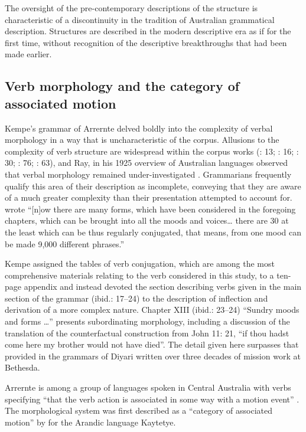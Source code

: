 The oversight of the pre-contemporary descriptions of the structure is characteristic of a discontinuity in the tradition of Australian grammatical description. Structures are described in the modern descriptive era as if for the first time, without recognition of the descriptive breakthroughs that had been made earlier.

\subsection{Verb morphology and the category of associated motion}
\label{sec:key:9.3.2}\label{bkm:Ref456085056}

Kempe’s grammar of Arrernte delved boldly into the complexity of verbal morphology in a way that is uncharacteristic of the corpus. Allusions to the complexity of verb structure are widespread within the corpus works (\citealt{teichelmann_outlines_1840}: 13; \citealt{schurmann_letter_1844}: 16; \citeyear{schurmann_aboriginal_1846}: 30; \citealt{ridley_kamilaroi_1855}: 76; \citeyear{ridley_kamilaroi_1866}: 63), and Ray, in his 1925 overview of Australian languages observed that verbal morphology remained under-investigated \citep[6]{ray_aboriginal_1925}. Grammarians frequently qualify this area of their description as incomplete, conveying that they are aware of a much greater complexity than their presentation attempted to account for. \citet[25]{kempe_grammar_1891} wrote “[n]ow there are many forms, which have been considered in the foregoing chapters, which can be brought into all the moods and voices… there are 30 at the least which can be thus regularly conjugated, that means, from one mood can be made 9,000 different phrases.”

Kempe assigned the tables of verb conjugation, which are among the most comprehensive materials relating to the verb considered in this study, to a ten-page appendix \citep[26--36]{kempe_grammar_1891} and instead devoted the section describing verbs given in the main section of the grammar (ibid.: 17--24) to the description of inflection and derivation of a more complex nature. Chapter XIII (ibid.: 23--24) “Sundry moods and forms …” presents subordinating morphology, including a discussion of the translation of the counterfactual construction from John 11: 21, “if thou hadst come here my brother would not have died''. The detail given here surpasses that provided in the grammars of Diyari written over three decades of mission work at Bethesda.

Arrernte is among a group of languages spoken in Central Australia with verbs specifying “that the verb action is associated in some way with a motion event” \citep[270]{wilkins_mparntwe_1989}. The morphological system was first described as a “category of associated motion” by \citet[23]{koch_category_1984} for the Arandic language Kaytetye. 

